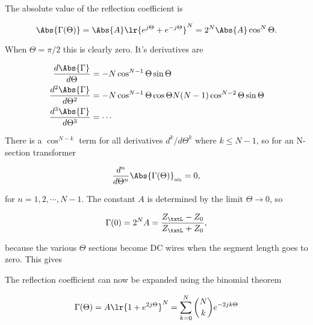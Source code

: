 The absolute value of the reflection coefficient is

\begin{dmath}\label{eqn:uwavesDeck7MultisectionTransformersCore:160}
\Abs{\Gamma(\Theta)} 
= 
\Abs{A} \lr{ e^{j \Theta} + e^{- j \Theta} }^N
= 
2^N \Abs{A} \cos^N\Theta.
\end{dmath}

When \( \Theta = \pi/2 \) this is clearly zero.  It's derivatives are

\begin{equation}\label{eqn:uwavesDeck7MultisectionTransformersCore:180}
\begin{aligned}
\frac{d \Abs{\Gamma}}{d\Theta} &= -N \cos^{N-1} \Theta \sin\Theta \\
\frac{d^2 \Abs{\Gamma}}{d\Theta^2} &= -N \cos^{N-1} \Theta \cos\Theta N(N-1) \cos^{N-2} \Theta \sin\Theta  \\
\frac{d^3 \Abs{\Gamma}}{d\Theta^3} &= \cdots 
\end{aligned}
\end{equation}

There is a \( \cos^{N-k} \) term for all derivatives \( d^k/d\Theta^k \) where \( k \le N-1 \), so for an N-section transformer

\begin{equation}\label{eqn:uwavesDeck7MultisectionTransformersCore:140}
\frac{d^n}{d\Theta^n} \Abs{\Gamma(\Theta)}_{\omega_0} = 0,
\end{equation}

for \( n = 1, 2, \cdots, N-1 \).  The constant \( A \) is determined by the limit \( \Theta \rightarrow 0 \), so

\begin{equation}\label{eqn:uwavesDeck7MultisectionTransformersCore:200}
\Gamma(0) = 2^N A = \frac{Z_\txtL - Z_0}{Z_\txtL + Z_0}, 
\end{equation}

because the various \( \Theta \) sections become DC wires when the segment length goes to zero.  This gives


The reflection coefficient can now be expanded using the binomial theorem

\begin{dmath}\label{eqn:uwavesDeck7MultisectionTransformersCore:240}
\Gamma(\Theta) 
= A \lr{ 1 + e^{ 2 j \Theta } }^N
= \sum_{k = 0}^N \binom{N}{k} e^{ -2 j k \Theta}
\end{dmath}

